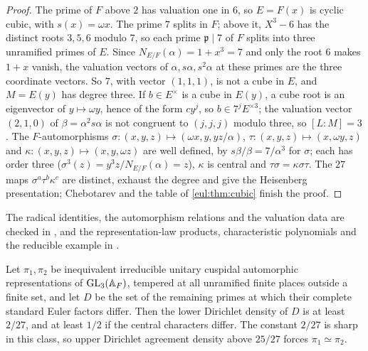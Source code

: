\begin{proof}
The prime of $F$ above $2$ has valuation one in $6$, so $E=F(x)$ is cyclic cubic, with $s(x)=\omega x$. The prime
$7$ splits in $F$; above it, $X^3-6$ has the distinct roots $3,5,6$ modulo $7$, so each prime $\mathfrak p\mid7$ of $F$
splits into three unramified primes of $E$. Since $N_{E/F}(\alpha)=1+x^3=7$ and only the root $6$ makes $1+x$
vanish, the valuation vectors of $\alpha,s\alpha,s^2\alpha$ at these primes are the three coordinate vectors. So
$7$, with vector $(1,1,1)$, is not a cube in $E$, and $M=E(y)$ has degree three. If $b\in E^\times$ is a cube in
$E(y)$, a cube root is an eigenvector of $y\mapsto\omega y$, hence of the form $cy^j$, so $b\in7^jE^{\times3}$; the
valuation vector $(2,1,0)$ of $\beta=\alpha^2s\alpha$ is not congruent to $(j,j,j)$ modulo three, so $[L:M]=3$. The
$F$-automorphisms $\sigma\colon(x,y,z)\mapsto(\omega x,y,yz/\alpha)$, $\tau\colon(x,y,z)\mapsto(x,\omega y,z)$ and
$\kappa\colon(x,y,z)\mapsto(x,y,\omega z)$ are well defined, by $s\beta/\beta=7/\alpha^3$ for $\sigma$; each has
order three ($\sigma^3(z)=y^3z/N_{E/F}(\alpha)=z$), $\kappa$ is central and $\tau\sigma=\kappa\sigma\tau$. The $27$
maps $\sigma^a\tau^b\kappa^c$ are distinct, exhaust the degree and give the Heisenberg presentation; Chebotarev and
the table of \cref{eul:thm:cubic} finish the proof.
\end{proof}

The radical identities, the automorphism relations and the valuation data are checked in
, and the representation-law products,
characteristic polynomials and the reducible example in
.

\begin{theorem}\label{eul:thm:gl3}
Let $\pi_1,\pi_2$ be inequivalent irreducible unitary cuspidal automorphic representations of $\operatorname{GL}_3(\mathbb A_F)$,
tempered at all unramified finite places outside a finite set, and let $D$ be the set of the remaining primes at which
their complete standard Euler factors differ. Then the lower Dirichlet density of $D$ is at least $2/27$, and at least
$1/2$ if the central characters differ. The constant $2/27$ is sharp in this class, so upper Dirichlet agreement
density above $25/27$ forces $\pi_1\simeq\pi_2$.
\end{theorem}

